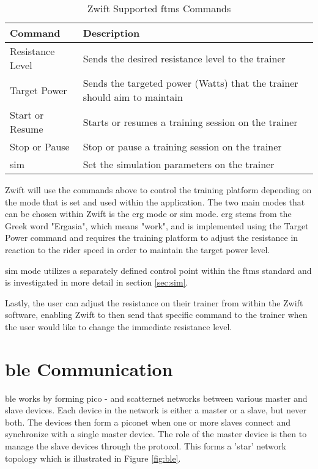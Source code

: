 \begin{table}[H]
	\renewcommand{\arraystretch}{\tablestretch}
	\centering
	\caption{Zwift Supported \ac{ftms} Commands}
	\begin{tabularx}{\textwidth}{ >{\raggedright}p{4cm} X}
		\toprule
		Command          & Description                                                              \\
		\midrule
		Resistance Level & Sends the desired resistance level to the trainer                        \\
		Target Power     & Sends the targeted power (Watts) that the trainer should aim to maintain \\
		Start or Resume  & Starts or resumes a training session on the trainer                      \\
		Stop or Pause    & Stop or pause a training session on the trainer                          \\
		\ac{sim}         & Set the simulation parameters on the trainer                             \\
		\bottomrule
	\end{tabularx}
	\label{tab:blreq}
\end{table}

Zwift will use the commands above to control the training platform depending on the mode that is set and used within the application. The two main modes that can be chosen within Zwift is the \acf{erg} mode or \acf{sim} mode. \ac{erg} stems from the Greek word "Ergasia", which means "work", and is implemented using the Target Power command and requires the training platform to adjust the resistance in reaction to the rider speed in order to maintain the target power level. \citep{Zwiftinsider:2022}

\ac{sim} mode utilizes a separately defined control point within the \ac{ftms} standard and is investigated in more detail in section \ref{sec:sim}.

Lastly, the user can adjust the resistance on their trainer from within the Zwift software, enabling Zwift to then send that specific command to the trainer when the user would like to change the immediate resistance level.

\section{\acf{ble} Communication}
\label{sec:ble}

\ac{ble} works by forming pico - and scatternet networks between various master and slave devices. Each device in the network is either a master or a slave, but never both. The devices then form a piconet when one or more slaves connect and synchronize with a single master device. The role of the master device is then to manage the slave devices through the protocol. This forms a 'star' network topology which is illustrated in Figure \ref{fig:ble}. \citep{Townsend:2014}

